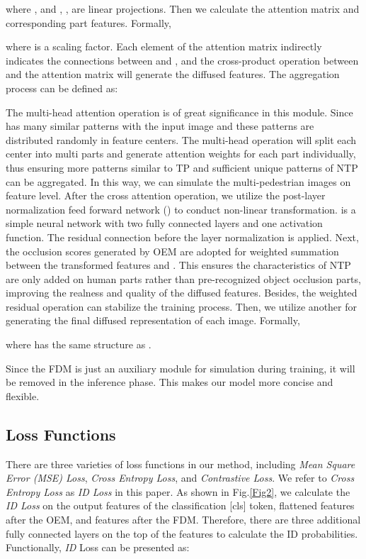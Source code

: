 \documentclass[10pt,twocolumn,letterpaper]{article}
\begin{document}
where , and , ,  are linear projections. Then we calculate the attention matrix and corresponding part features. Formally, 

where  is a scaling factor. Each element of the attention matrix indirectly indicates the connections between  and , and the cross-product operation between  and the attention matrix will generate the diffused features. 
The aggregation process can be defined as:

The multi-head attention operation is of great significance in this module. Since  has many similar patterns with the input image and these patterns are distributed randomly in  feature centers. 
The multi-head operation will split each center into multi parts and generate attention weights for each part individually, thus ensuring more patterns similar to TP and sufficient unique patterns of NTP can be aggregated. 
In this way, we can simulate the multi-pedestrian images on feature level. 
After the cross attention operation, we utilize the post-layer normalization feed forward network () \cite{xiong2020layer} to conduct non-linear transformation.  is a simple neural network with two fully connected layers and one activation function. The residual connection before the layer normalization is applied. 
Next, the occlusion scores generated by OEM are adopted for weighted summation between the transformed features and . 
This ensures the characteristics of NTP are only added on human parts rather than pre-recognized object occlusion parts, improving the realness and quality of the diffused features. Besides, the weighted residual operation can stabilize the training process. 
Then, we utilize another  \cite{xiong2020layer} for generating the final diffused representation of each image. 
Formally,

where  has the same structure as .

Since the FDM is just an auxiliary module for simulation during training, it will be removed in the inference phase. This makes our model more concise and flexible. 











\subsection{Loss Functions}
There are three varieties of loss functions in our method, including \emph{Mean Square Error (MSE) Loss}, \emph{Cross Entropy Loss}, and \emph{Contrastive Loss}. We refer to \emph{Cross Entropy Loss} as \emph{ID Loss} in this paper. As shown in Fig.\ref{Fig2}, we calculate the \emph{ID Loss} on the output features of the classification [cls] token, flattened features after the OEM, and features after the FDM. Therefore, there are three additional fully connected layers on the top of the features to calculate the ID probabilities. 
Functionally, \emph{ID} Loss can be presented as:
\end{document}
